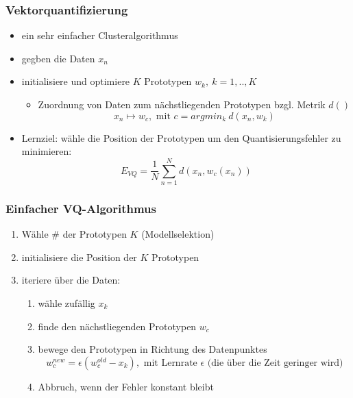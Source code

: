 	\subsubsection{Vektorquantifizierung}
	\begin{itemize}
		\item ein sehr einfacher Clusteralgorithmus
		\item gegben die Daten $x_n$
		\item initialisiere und optimiere $K$ Prototypen $w_k,~ k=1,.., K$
		\begin{itemize}
			\item Zuordnung von Daten zum nächstliegenden Prototypen bzgl. Metrik $d()$
			\begin{equation*}
				x_n \mapsto w_c, \text{ mit } c = argmin_k~d(x_n,w_k)
			\end{equation*}
		\end{itemize}
		\item Lernziel: wähle die Position der Prototypen um den Quantisierungsfehler zu minimieren:
		\begin{equation*}
			E_{VQ} = \frac{1}{N}\sum_{n=1}^Nd(x_n, w_c(x_n))
		\end{equation*}
	\end{itemize}
	\subsubsection{Einfacher VQ-Algorithmus}
	\begin{enumerate}
		\item Wähle \# der Prototypen $K$ (Modellselektion)
		\item initialisiere die Position der $K$ Prototypen
		\item iteriere über die Daten:
		\begin{enumerate}
			\item wähle zufällig $x_k$
			\item finde den nächstliegenden Prototypen $w_c$
			\item bewege den Prototypen in Richtung des Datenpunktes
			\begin{equation*}
				w_c^{new} = \epsilon(w_c^{old}-x_k), \text { mit Lernrate $\epsilon$ (die über die Zeit geringer wird)}
			\end{equation*}
			\item Abbruch, wenn der Fehler konstant bleibt
		\end{enumerate}
	\end{enumerate}
